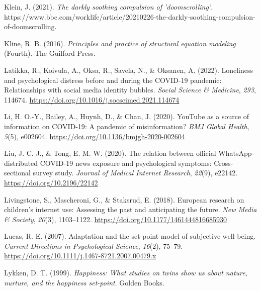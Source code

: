 \documentclass[
  man,mask]{apa7}
\newlength{\cslhangindent}
\newlength{\cslentryspacingunit} %
\newenvironment{CSLReferences}[2] %
 {%
  \setlength{\parindent}{0pt}
  \ifodd #1
  \let\oldpar\par
  \def\par{\hangindent=\cslhangindent\oldpar}
  \fi
  \setlength{\parskip}{#2\cslentryspacingunit}
 }%
 {}
\begin{document}
\begin{CSLReferences}{1}{0}
\leavevmode{}%
Klein, J. (2021). \emph{The darkly soothing compulsion of 'doomscrolling'}. https://www.bbc.com/worklife/article/20210226-the-darkly-soothing-compulsion-of-doomscrolling.

\leavevmode{}%
Kline, R. B. (2016). \emph{Principles and practice of structural equation modeling} (Fourth). {The Guilford Press}.

\leavevmode{}%
Latikka, R., Koivula, A., Oksa, R., Savela, N., \& Oksanen, A. (2022). Loneliness and psychological distress before and during the {COVID-19} pandemic: {Relationships} with social media identity bubbles. \emph{Social Science \& Medicine}, \emph{293}, 114674. \url{https://doi.org/10.1016/j.socscimed.2021.114674}

\leavevmode{}%
Li, H. O.-Y., Bailey, A., Huynh, D., \& Chan, J. (2020). {YouTube} as a source of information on {COVID-19}: A pandemic of misinformation? \emph{BMJ Global Health}, \emph{5}(5), e002604. \url{https://doi.org/10.1136/bmjgh-2020-002604}

\leavevmode{}%
Liu, J. C. J., \& Tong, E. M. W. (2020). The relation between official {WhatsApp-distributed COVID-19} news exposure and psychological symptoms: Cross-sectional survey study. \emph{Journal of Medical Internet Research}, \emph{22}(9), e22142. \url{https://doi.org/10.2196/22142}

\leavevmode{}%
Livingstone, S., Mascheroni, G., \& Staksrud, E. (2018). European research on children's internet use: {Assessing} the past and anticipating the future. \emph{New Media \& Society}, \emph{20}(3), 1103--1122. \url{https://doi.org/10.1177/1461444816685930}

\leavevmode{}%
Lucas, R. E. (2007). Adaptation and the set-point model of subjective well-being. \emph{Current Directions in Psychological Science}, \emph{16}(2), 75--79. \url{https://doi.org/10.1111/j.1467-8721.2007.00479.x}

\leavevmode{}%
Lykken, D. T. (1999). \emph{Happiness: {What} studies on twins show us about nature, nurture, and the happiness set-point}. {Golden Books}.


\end{CSLReferences}
\end{document}
